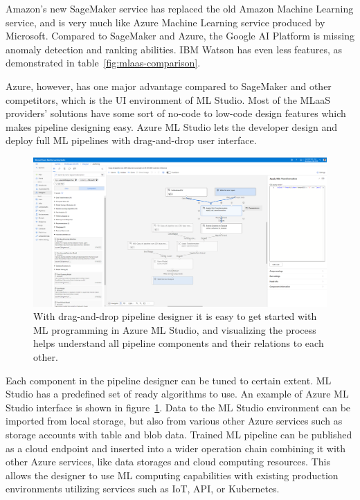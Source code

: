 Amazon's new SageMaker service
has replaced the old Amazon Machine Learning service,
and is very much like Azure Machine Learning service
produced by Microsoft.
Compared to SageMaker and Azure, the
Google AI Platform is missing anomaly detection and ranking abilities.
IBM Watson has even less features,
as demonstrated in table~\ref{fig:mlaas-comparison}.~\cite{altexsoft2021mlaas}

Azure, however,
has one major advantage compared to SageMaker and other competitors,
which is the UI environment of ML Studio.
Most of the MLaaS providers' solutions
have some sort of no-code to low-code design features
which makes pipeline designing easy.
Azure ML Studio lets the developer design and deploy
full ML pipelines with drag-and-drop user interface.~\cite{altexsoft2021mlaas,microsoft2022azureml}

\begin{figure}[htb]
    \centering
    \includegraphics[width=150mm]{./appendices/azure-ml-studio-example}
    \caption{With drag-and-drop pipeline designer
    it is easy to get started with ML programming in Azure ML Studio,
    and visualizing the process helps understand all pipeline components
    and their relations to each other.
    \label{fig:azure-ml-studio-example}}
\end{figure}

Each component in the pipeline designer can be tuned
to certain extent.
ML Studio has a predefined set of ready algorithms to use.
An example of Azure ML Studio interface
is shown in figure~\ref{fig:azure-ml-studio-example}.
Data to the ML Studio environment
can be imported from local storage,
but also from various other Azure services
such as storage accounts with table and blob data.
Trained ML pipeline can be published as a cloud endpoint
and inserted into a wider operation chain
combining it with other Azure services,
like data storages and cloud computing resources.
This allows the designer to use ML computing capabilities
with existing production environments
utilizing services such as IoT, API, or Kubernetes.


